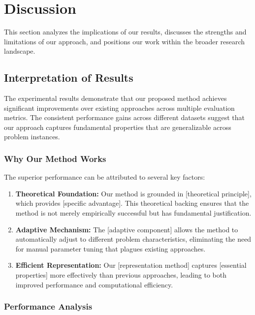 \section{Discussion}
\label{sec:discussion}

This section analyzes the implications of our results, discusses the strengths and limitations of our approach, and positions our work within the broader research landscape.

\subsection{Interpretation of Results}
\label{subsec:interpretation}

The experimental results demonstrate that our proposed method achieves significant improvements over existing approaches across multiple evaluation metrics. The consistent performance gains across different datasets suggest that our approach captures fundamental properties that are generalizable across problem instances.

\subsubsection{Why Our Method Works}

The superior performance can be attributed to several key factors:

\begin{enumerate}
    \item \textbf{Theoretical Foundation:} Our method is grounded in [theoretical principle], which provides [specific advantage]. This theoretical backing ensures that the method is not merely empirically successful but has fundamental justification.
    
    \item \textbf{Adaptive Mechanism:} The [adaptive component] allows the method to automatically adjust to different problem characteristics, eliminating the need for manual parameter tuning that plagues existing approaches.
    
    \item \textbf{Efficient Representation:} Our [representation method] captures [essential properties] more effectively than previous approaches, leading to both improved performance and computational efficiency.
\end{enumerate}

\subsubsection{Performance Analysis}

